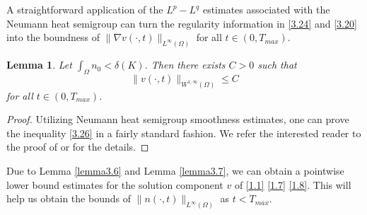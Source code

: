 \documentclass[12pt]{article}
\theoremstyle{plain}
\newtheorem{lemma}{Lemma}[section]
\theoremstyle{definition}
\numberwithin{equation}{section}
\begin{document}
A straightforward application of the $L^p-L^q$ estimates associated with the Neumann heat semigroup can turn the regularity information in \eqref{3.24} and \eqref{3.20}  into the boundness of $\|\nabla v(\cdot,t)\|_{L^{\infty}(\Omega)}$  for all $t\in (0, T_{max})$.


\begin{lemma}\label{lemma3.8} Let $\int_\Omega n_0<\delta(K)$. Then there exists  $C>0$  such that
\begin{equation}\label{3.26}
\|v(\cdot,t)\|_{W^{1,\infty}(\Omega)}\leq C
\end{equation}
for all $t\in (0, T_{max})$.
\end{lemma}\begin{proof} Utilizing Neumann heat semigroup smoothness estimates, one can prove the inequality \eqref{3.26} in a fairly standard fashion. We refer the interested reader to the proof of \cite[Lemma 3.9] {Winklerpreprint} or  \cite[Lemma 3.13]{Heihoff} for the details.
\end{proof}

Due to Lemma \ref{lemma3.6} and Lemma \ref{lemma3.7}, we can obtain a pointwise lower bound estimates for the solution component $v$
of \eqref{1.1} \eqref{1.7} \eqref{1.8}. This will help us obtain the bounds of $\|n(\cdot,t)\|_{L^\infty(\Omega)}$ as $t<T_{max}$.
\end{document}
